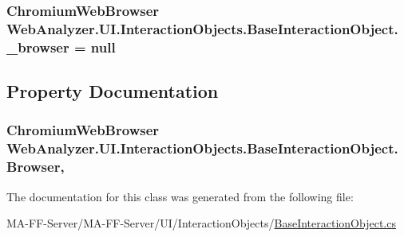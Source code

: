 \subsubsection[{\+\_\+browser}]{\setlength{\rightskip}{0pt plus 5cm}Chromium\+Web\+Browser Web\+Analyzer.\+U\+I.\+Interaction\+Objects.\+Base\+Interaction\+Object.\+\_\+browser = null\hspace{0.3cm}{\ttfamily [private]}}\label{class_web_analyzer_1_1_u_i_1_1_interaction_objects_1_1_base_interaction_object_aa56933a7ca14c6251019e27c6ec97813}


\subsection{Property Documentation}
\hypertarget{class_web_analyzer_1_1_u_i_1_1_interaction_objects_1_1_base_interaction_object_aac4f2f8441547dc677f700485c295259}{}
\subsubsection[{Browser}]{\setlength{\rightskip}{0pt plus 5cm}Chromium\+Web\+Browser Web\+Analyzer.\+U\+I.\+Interaction\+Objects.\+Base\+Interaction\+Object.\+Browser\hspace{0.3cm}{\ttfamily [get]}, {\ttfamily [set]}}\label{class_web_analyzer_1_1_u_i_1_1_interaction_objects_1_1_base_interaction_object_aac4f2f8441547dc677f700485c295259}


The documentation for this class was generated from the following file\+:\begin{DoxyCompactItemize}
\item 
M\+A-\/\+F\+F-\/\+Server/\+M\+A-\/\+F\+F-\/\+Server/\+U\+I/\+Interaction\+Objects/\hyperlink{_base_interaction_object_8cs}{Base\+Interaction\+Object.\+cs}\end{DoxyCompactItemize}
